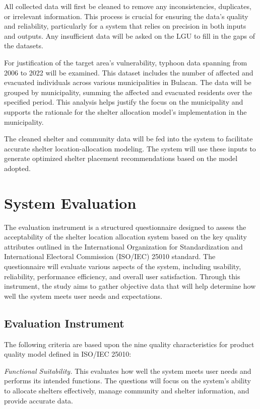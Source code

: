 	All collected data will first be cleaned to remove any inconsistencies, duplicates, or irrelevant information. This process is crucial for ensuring the data’s quality and reliability, particularly for a system that relies on precision in both inputs and outputs. Any insufficient data will be asked on the LGU to fill in the gaps of the datasets. 
	
	For justification of the target area’s vulnerability, typhoon data spanning from 2006 to 2022 will be examined. This dataset includes the number of affected and evacuated individuals across various municipalities in Bulacan. The data will be grouped by municipality, summing the affected and evacuated residents over the specified period. This analysis helps justify the focus on the municipality and supports the rationale for the shelter allocation model’s implementation in the municipality.
	
	The cleaned shelter and community data will be fed into the system to facilitate accurate shelter location-allocation modeling. The system will use these inputs to generate optimized shelter placement recommendations based on the model adopted.
	
	
\section{System Evaluation}
	The evaluation instrument is a structured questionnaire designed to assess the acceptability of the shelter location allocation system based on the key quality attributes outlined in the International Organization for Standardization and International Electoral Commission (ISO/IEC) 25010 standard. The questionnaire will evaluate various aspects of the system, including usability, reliability, performance efficiency, and overall user satisfaction. Through this instrument, the study aims to gather objective data that will help determine how well the system meets user needs and expectations. \parencite{ISOIEC2023}

\subsection{Evaluation Instrument}
	The following criteria are based upon the nine quality characteristics for product quality model defined in ISO/IEC 25010:
	
	\textit{Functional Suitability.} This evaluates how well the system meets user needs and performs its intended functions. The questions will focus on the system's ability to allocate shelters effectively, manage community and shelter information, and provide accurate data.
	
